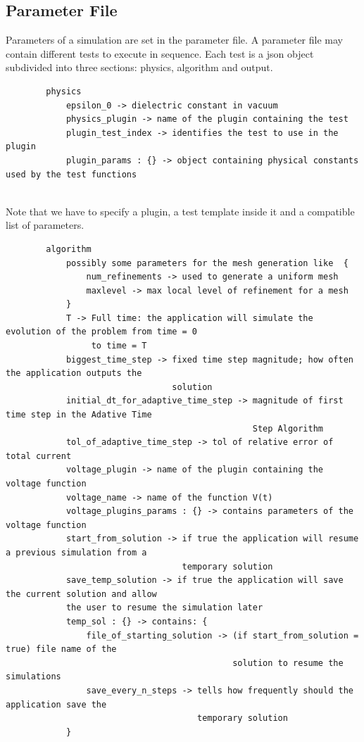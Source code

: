 \documentclass[11pt,a4paper]{article}
\begin{document}
\subsection{Parameter File}
Parameters of a simulation are set in the parameter file. A parameter file may contain different tests to execute in sequence. Each test is a json object subdivided into three sections: physics, algorithm and output.\\
\begin{minipage}{\textwidth}
	\vspace{3mm}
	\small
	\begin{verbatim}
		physics
		    epsilon_0 -> dielectric constant in vacuum
		    physics_plugin -> name of the plugin containing the test
		    plugin_test_index -> identifies the test to use in the plugin
		    plugin_params : {} -> object containing physical constants used by the test functions
	\end{verbatim}
	\vspace*{0mm}
\end{minipage}\\
Note that we have to specify a plugin, a test template inside it and a compatible list of parameters.\\
\begin{minipage}{\textwidth}
	\vspace{3mm}
	\small
	\begin{verbatim}
		algorithm
		    possibly some parameters for the mesh generation like  {
		        num_refinements -> used to generate a uniform mesh
			    maxlevel -> max local level of refinement for a mesh
		    }
		    T -> Full time: the application will simulate the evolution of the problem from time = 0
		         to time = T
		    biggest_time_step -> fixed time step magnitude; how often the application outputs the
		                         solution
		    initial_dt_for_adaptive_time_step -> magnitude of first time step in the Adative Time
		                                         Step Algorithm
		    tol_of_adaptive_time_step -> tol of relative error of total current
		    voltage_plugin -> name of the plugin containing the voltage function
		    voltage_name -> name of the function V(t)
		    voltage_plugins_params : {} -> contains parameters of the voltage function
		    start_from_solution -> if true the application will resume a previous simulation from a
		                           temporary solution
		    save_temp_solution -> if true the application will save the current solution and allow
		    the user to resume the simulation later
		    temp_sol : {} -> contains: {
		        file_of_starting_solution -> (if start_from_solution = true) file name of the
		                                     solution to resume the simulations
		        save_every_n_steps -> tells how frequently should the application save the
		                              temporary solution
		    }
	\end{verbatim}
\end{minipage}\\
\end{document}
